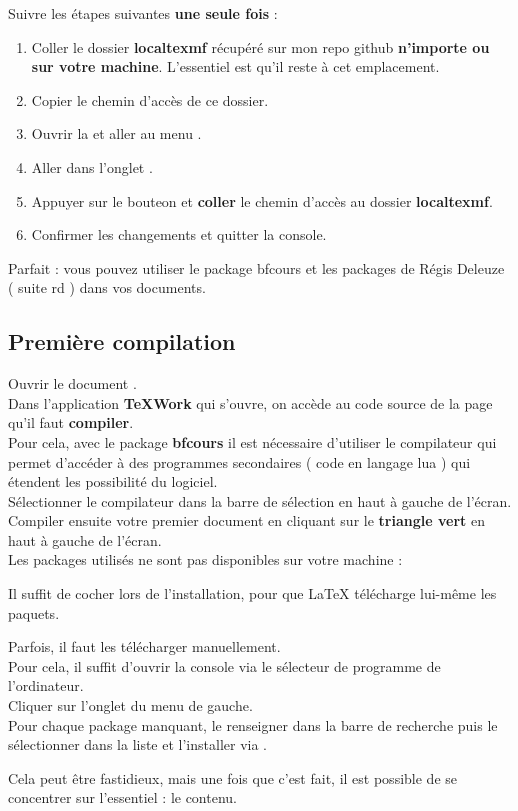 Suivre les étapes suivantes \textbf{une seule fois} :
\begin{enumerate}
	\item Coller le dossier \textbf{localtexmf} récupéré sur mon repo github \textbf{n'importe ou sur votre machine}. L'essentiel est qu'il reste à cet emplacement. \\
	\item Copier le chemin d'accès de ce dossier. \\
	\item Ouvrir la  et aller au menu .
	\item Aller dans l'onglet .
	\item Appuyer sur le bouteon \frquote{+} et \textbf{coller} le chemin d'accès au dossier \textbf{localtexmf}.
	\item Confirmer les changements et quitter la console. 
\end{enumerate}

Parfait : vous pouvez utiliser le package bfcours et les packages de Régis Deleuze ( suite rd ) dans vos documents. 

\subsection{Première compilation}

Ouvrir le document . \\
Dans l'application \textbf{TeXWork} qui s'ouvre, on accède au code source de la page qu'il faut \textbf{compiler}.\\

Pour cela, avec le package \textbf{bfcours} il est nécessaire d'utiliser le compilateur  qui permet 
d'accéder à des programmes secondaires ( code en langage lua ) qui étendent les possibilité du logiciel.\\
Sélectionner le compilateur  dans la barre de sélection en haut à gauche de l'écran. \\
Compiler ensuite votre premier document en cliquant sur le \textbf{triangle vert} en haut à gauche de l'écran. \\


\bcattention Les packages utilisés ne sont pas disponibles sur votre machine :
\begin{multicols}{2}
	Il suffit de cocher  lors de l'installation, pour que LaTeX télécharge lui-même les paquets.\\

	\columnbreak

	Parfois, il faut les télécharger manuellement.\\
	Pour cela, il suffit d'ouvrir la console  via le sélecteur de programme de l'ordinateur.\\
	Cliquer sur l'onglet  du menu de gauche.\\
	Pour chaque package manquant, le renseigner dans la barre de recherche puis le sélectionner dans la liste et l'installer via .
\end{multicols}

Cela peut être fastidieux, mais une fois que c'est fait, il est possible de se concentrer sur l'essentiel : le contenu.